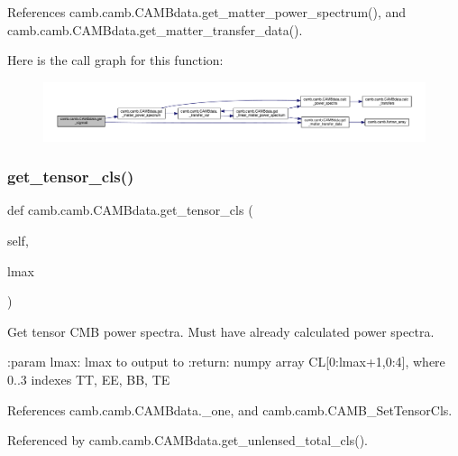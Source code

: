 References camb.\+camb.\+C\+A\+M\+Bdata.\+get\+\_\+matter\+\_\+power\+\_\+spectrum(), and camb.\+camb.\+C\+A\+M\+Bdata.\+get\+\_\+matter\+\_\+transfer\+\_\+data().

Here is the call graph for this function\+:
\nopagebreak
\begin{figure}[H]
\begin{center}
\leavevmode
\includegraphics[width=350pt]{classcamb_1_1camb_1_1CAMBdata_a1891baad8b4e53b2a1f2d136ddbef5e2_cgraph}
\end{center}
\end{figure}
\mbox{\label{classcamb_1_1camb_1_1CAMBdata_a3ae85ffc476cbae0733fee4ab2283cb9}} 
\subsubsection{\texorpdfstring{get\+\_\+tensor\+\_\+cls()}{get\_tensor\_cls()}}
{\footnotesize\ttfamily def camb.\+camb.\+C\+A\+M\+Bdata.\+get\+\_\+tensor\+\_\+cls (\begin{DoxyParamCaption}\item[{}]{self,  }\item[{}]{lmax }\end{DoxyParamCaption})}

\begin{DoxyVerb}Get tensor CMB power spectra. Must have already calculated power spectra.

:param lmax: lmax to output to
:return: numpy array CL[0:lmax+1,0:4], where 0..3 indexes TT, EE, BB, TE
\end{DoxyVerb}
 

References camb.\+camb.\+C\+A\+M\+Bdata.\+\_\+one, and camb.\+camb.\+C\+A\+M\+B\+\_\+\+Set\+Tensor\+Cls.



Referenced by camb.\+camb.\+C\+A\+M\+Bdata.\+get\+\_\+unlensed\+\_\+total\+\_\+cls().

